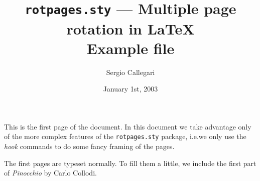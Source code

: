 \documentclass[12pt,twoside]{article}
\title{\texttt{rotpages.sty} --- Multiple page rotation in \LaTeX\\
  Example file}
\author{Sergio Callegari}
\date{January 1st, 2003}
\begin{document}
\sloppy
\pagestyle{fancy}
\maketitle
\thispagestyle{fancy}

\setlength{\rotboxheight}{\vsize-9ex-1pt}
\setlength{\rotboxwidth}{\hsize-4ex-1pt}

\renewcommand{\rotboxAtRotationHook}[1]{%
  \addtocounter{rotpg}{1}%
  {\fboxsep 2ex%
  \fbox{\parbox{\linewidth}{%
    \scalebox{-1}{\footnotesize\textsc{Rotated page \therotpg}}\\
    #1}}}}
\renewcommand{\rotboxAtShippingHook}[1]{%
  \parbox{\linewidth}{%
    \rule{\linewidth}{0.5pt}\\[-1ex]
    \hspace*{0pt}\hfill CAPOVOLGERE IL TESTO PER LEGGERE CORRETTAMENTE QUESTA
    PAGINA\hfill\hspace*{0pt}\\
    #1\\
    \hspace*{0pt}\hfill CAPOVOLGERE IL TESTO PER LEGGERE CORRETTAMENTE QUESTA
    PAGINA\hfill\hspace*{0pt}\\[-2ex]%
    \rule{\linewidth}{0.5pt}
  }}

This is the first page of the document. In this document we take
advantage only of the more complex features of the \texttt{rotpages.sty}
package, i.e.\@ we only use the \emph{hook} commands to do some fancy
framing of the pages.


The first pages are typeset normally.  To fill them a little, we include
the first part of \emph{Pinocchio} by Carlo Collodi.
\end{document}
